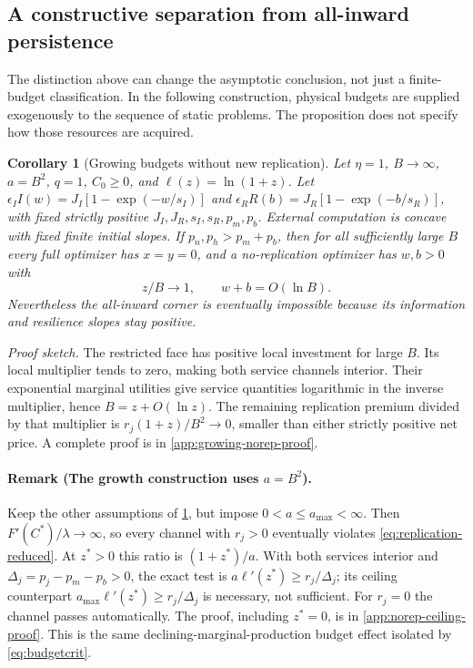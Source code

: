 \documentclass[11pt,a4paper]{article}
\newtheorem{corollary}[proposition]{Corollary}
\theoremstyle{definition}\newtheorem{definition}{Definition}
\begin{document}
\subsection{A constructive separation from all-inward persistence}
The distinction above can change the asymptotic conclusion, not just a
finite-budget classification. In the following construction, physical
budgets are supplied exogenously to the sequence of static problems.
The proposition does not specify how those resources are acquired.

\begin{corollary}[Growing budgets without new replication]
\label{cor:growing-no-replication}
Let $\eta=1$, $B\to\infty$, $a=B^2$, $q=1$, $C_0\geq0$, and
$\ell(z)=\ln(1+z)$. Let
$\epsilon_I I(w)=J_I[1-\exp(-w/s_I)]$ and
$\epsilon_R R(b)=J_R[1-\exp(-b/s_R)]$, with fixed strictly positive
$J_I,J_R,s_I,s_R,p_m,p_b$. External computation is concave with fixed
finite initial slopes. If $p_n,p_h>p_m+p_b$, then for all sufficiently
large $B$ every full optimizer has $x=y=0$, and a no-replication optimizer
has $w,b>0$ with
\[
 z/B\longrightarrow1,\qquad w+b=O(\ln B).
\]
Nevertheless the all-inward corner is eventually impossible because its
information and resilience slopes stay positive.
\end{corollary}
\noindent\emph{Proof sketch.}
The restricted face has positive local investment for large $B$.
Its local multiplier tends to zero, making both service channels interior.
Their exponential marginal utilities give service quantities logarithmic
in the inverse multiplier, hence $B=z+O(\ln z)$. The remaining replication
premium divided by that multiplier is $r_j(1+z)/B^2\to0$, smaller than
either strictly positive net price. A complete proof is in
\cref{app:growing-norep-proof}.

\paragraph{Remark (The growth construction uses $a=B^2$).}
Keep the other assumptions of \cref{cor:growing-no-replication}, but
impose $0<a\leq a_{\max}<\infty$. Then $F'(C^*)/\lambda\to\infty$,
so every channel with $r_j>0$ eventually violates
\cref{eq:replication-reduced}. At $z^*>0$ this ratio is $(1+z^*)/a$.
With both services interior and $\Delta_j=p_j-p_m-p_b>0$, the exact test is
$a\ell'(z^*)\geq r_j/\Delta_j$; its ceiling counterpart
$a_{\max}\ell'(z^*)\geq r_j/\Delta_j$ is necessary, not sufficient.
For $r_j=0$ the channel passes automatically. The proof, including $z^*=0$,
is in \cref{app:norep-ceiling-proof}. This is the same declining-marginal-production
budget effect isolated by \cref{eq:budgetcrit}.
\end{document}
